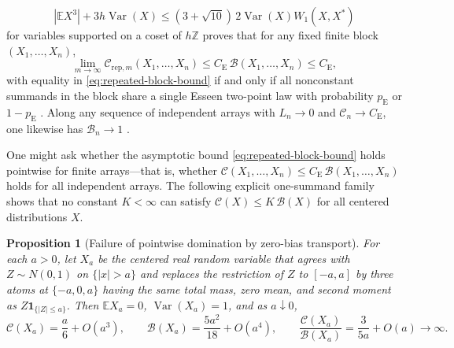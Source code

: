 \documentclass[11pt]{article}
\numberwithin{equation}{section}
\newtheorem{proposition}[theorem]{Proposition}
\theoremstyle{definition}
\theoremstyle{remark}
\DeclareMathOperator{\Var}{Var}
\newcommand{\E}{\mathbb E}
\newcommand{\Z}{\mathbb Z}
\newcommand{\ind}{\mathbf1}
\newcommand{\ce}{C_{\mathrm E}}
\newcommand{\pe}{p_{\mathrm E}}
\begin{document}
\[
 |\E X^3|+3h\Var(X)\le(3+\sqrt{10})\,2\Var(X)W_1(X,X^*)
\]
for variables supported on a coset of $h\Z$ proves that for any fixed finite
block $(X_1,\ldots,X_n)$,
\begin{equation}\label{eq:repeated-block-bound}
 \lim_{m\to\infty}\mathcal C_{\mathrm{rep},m}(X_1,\ldots,X_n)
 \le\ce\,\mathcal B(X_1,\ldots,X_n)\le\ce,
\end{equation}
with equality in \eqref{eq:repeated-block-bound} if and only if all
nonconstant summands in the block share a single Esseen two-point law with
probability $\pe$ or $1-\pe$ \citep[Theorem~1.2]{BellTransport2026}. Along any
sequence of independent arrays with $L_n\to0$ and $\mathcal C_n\to\ce$, one
likewise has $\mathcal B_n\to1$ \citep[Theorem~1.1]{BellSmallStructure2026}.

One might ask whether the asymptotic bound \eqref{eq:repeated-block-bound}
holds pointwise for finite arrays---that is, whether
$\mathcal C(X_1,\ldots,X_n)\le\ce\,\mathcal B(X_1,\ldots,X_n)$ holds for all
independent arrays. The following explicit one-summand family shows that no
constant $K<\infty$ can satisfy $\mathcal C(X)\le K\,\mathcal B(X)$ for all
centered distributions $X$.

\begin{proposition}[Failure of pointwise domination by zero-bias transport]\label{prop:transport-counterexample}
For each $a>0$, let $X_a$ be the centered real random variable that agrees
with $Z\sim N(0,1)$ on $\{|x|>a\}$ and replaces the restriction of $Z$ to
$[-a,a]$ by three atoms at $\{-a,0,a\}$ having the same total mass, zero
mean, and second moment as $Z\ind_{\{|Z|\le a\}}$. Then $\E X_a=0$,
$\Var(X_a)=1$, and as $a\downarrow0$,
\begin{equation}\label{eq:xa-asymptotics}
 \mathcal C(X_a)=\frac{a}{6}+O(a^3),\qquad
 \mathcal B(X_a)=\frac{5a^2}{18}+O(a^4),\qquad
 \frac{\mathcal C(X_a)}{\mathcal B(X_a)}=\frac{3}{5a}+O(a)\longrightarrow\infty.
\end{equation}
\end{proposition}
\end{document}
